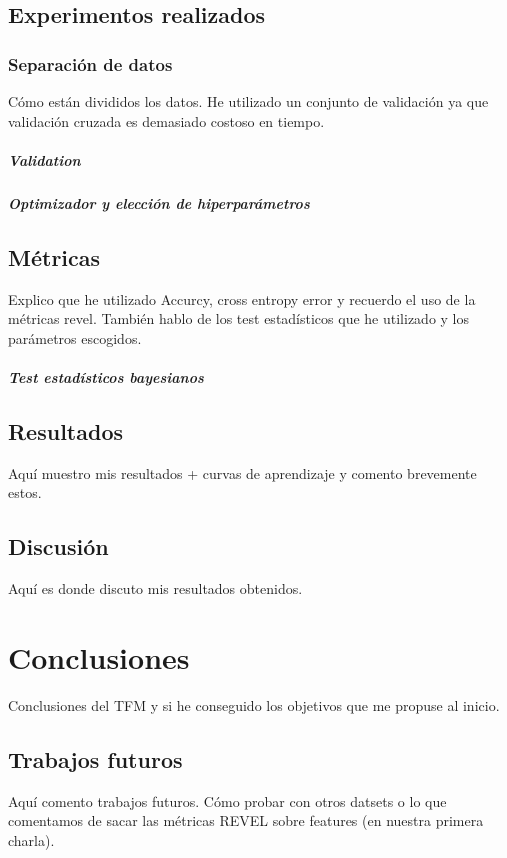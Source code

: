 \section{Experimentos realizados}

\subsection{Separación de datos}

Cómo están divididos los datos. He utilizado un conjunto de validación ya que validación cruzada es demasiado costoso en tiempo.

\paragraph*{Validation}

\paragraph*{Optimizador y elección de hiperparámetros}



\section{Métricas}
Explico que he utilizado Accurcy, cross entropy error y recuerdo el uso de la métricas revel. También hablo de los test estadísticos que he utilizado y los parámetros escogidos.
\paragraph*{Test estadísticos bayesianos}


\section{Resultados}

Aquí muestro mis resultados + curvas de aprendizaje y comento brevemente estos.

\section{Discusión} \label{sec:discusion}
Aquí es donde discuto mis resultados obtenidos.


\clearpage
\chapter{Conclusiones} \label{cap:conc}
Conclusiones del TFM y si he conseguido los objetivos que me propuse al inicio.

\section{Trabajos futuros}

Aquí comento trabajos futuros. Cómo probar con otros datsets o lo que comentamos de sacar las métricas REVEL sobre features (en nuestra primera charla).



